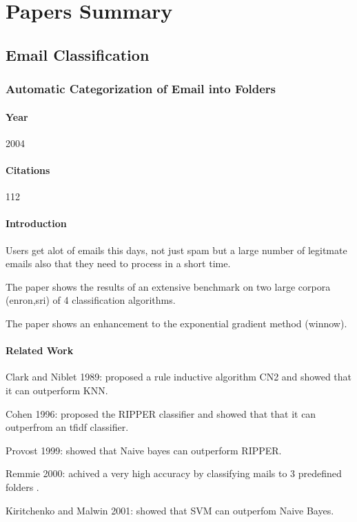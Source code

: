 \documentclass[12pt]{article}
\newenvironment{my_itemize}
{\begin{itemize}
  \setlength{\itemsep}{0cm}
  \setlength{\parskip}{0cm}}
{\end{itemize}}
\begin{document}
\section{Papers Summary}
\subsection{Email Classification}

\subsubsection{Automatic Categorization of Email into Folders \cite{RON04}}

\paragraph{Year} 2004
\paragraph{Citations} 112
\paragraph{Introduction}
\begin{my_itemize}
  \item Users get alot of emails this days, not just spam but a large number of 
	legitmate emails also that they need to process in a short time.
  \item The paper shows the results of an extensive benchmark on two large corpora 
	(enron,sri) of 4 classification algorithms.
  \item The paper shows an enhancement to the exponential gradient method (winnow).
\end{my_itemize}

\paragraph{Related Work}
\begin{my_itemize}
  \item Clark and Niblet 1989: proposed a rule inductive algorithm CN2 and 
	showed that it can outperform KNN.
  \item Cohen 1996: proposed the RIPPER classifier and showed that that it 
	can outperfrom an tfidf classifier.
  \item Provost 1999: showed that Naive bayes can outperform RIPPER.
  \item Remmie 2000: achived a very high accuracy by classifying mails to 
	3 predefined folders .
  \item Kiritchenko and Malwin 2001: showed that SVM can outperfom Naive Bayes.
\end{my_itemize}
\end{document}

